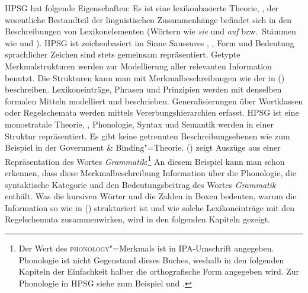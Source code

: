 HPSG hat folgende Eigenschaften: Es ist eine lexikonbasierte Theorie,
\dash, der wesentliche Bestandteil der linguistischen Zusammenhänge
befindet sich in den Beschreibungen von Lexikonelementen (Wörtern wie \emph{sie} und \emph{auf}
bzw.\ Stämmen wie  und ). HPSG ist zeichenbasiert
im Sinne Saussures \citeyearpar{Saussure16a-de}, \dash, Form und Bedeutung
sprachlicher Zeichen sind stets gemeinsam repräsentiert. Getypte
Merkmalstrukturen werden zur Modellierung
aller relevanten Information benutzt. Die Strukturen kann man mit Merkmalbeschreibungen wie der in
() beschreiben. Lexikoneinträge, Phrasen
und Prinzipien werden mit denselben formalen Mitteln modelliert und beschrieben.
Generalisierungen über Wortklassen oder Regelschemata werden
mittels Vererbungshierarchien erfasst.
HPSG ist eine monostratale Theorie, \dash, Phonologie, Syntax
und Semantik werden in einer Struktur repräsentiert. Es gibt keine
getrennten Beschreibungsebenen wie zum Beispiel in der Government \& Binding"=Theorie\indexgb.
() zeigt Auszüge aus einer Repräsentation des Wortes \emph{Grammatik}:\footnote{Der Wert des
  \textsc{phonology}"=Merkmals ist in IPA-Umschrift angegeben. Phonologie ist nicht Gegenstand
  dieses Buches, weshalb in den folgenden Kapiteln der Einfachkeit halber die orthografische Form angegeben
  wird. Zur Phonologie in HPSG siehe zum Beispiel  und .
}
\ea
{}
\z
An diesem Beispiel kann man schon erkennen, dass diese Merkmalbeschreibung
Information über die Phonologie, die syntaktische Kategorie und den Bedeutungsbeitrag
des Wortes \emph{Grammatik} enthält. Was die kursiven Wörter und die Zahlen in Boxen
bedeuten, warum die Information so wie in () strukturiert ist und wie solche Lexikoneinträge
mit den Regelschemata zusammenwirken, wird in den folgenden Kapiteln gezeigt.

